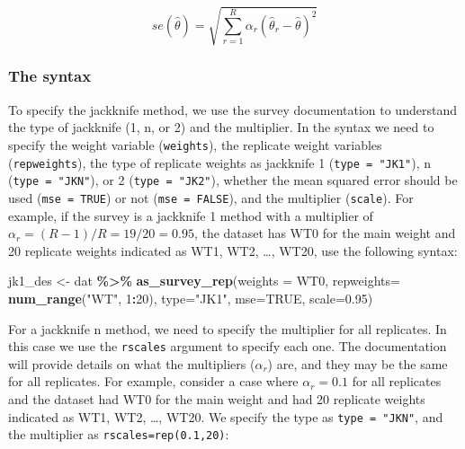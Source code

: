 \documentclass[
]{krantz}
\makeatletter
\newenvironment{Shaded}{\begin{snugshade}}{\end{snugshade}}
\newcommand{\AttributeTok}[1]{\textcolor[rgb]{0.27,0.27,0.27}{#1}}
\newcommand{\ConstantTok}[1]{\textcolor[rgb]{0.37,0.37,0.37}{#1}}
\newcommand{\DecValTok}[1]{\textcolor[rgb]{0.06,0.06,0.06}{#1}}
\newcommand{\FloatTok}[1]{\textcolor[rgb]{0.06,0.06,0.06}{#1}}
\newcommand{\FunctionTok}[1]{\textcolor[rgb]{0.27,0.27,0.27}{\textbf{#1}}}
\newcommand{\NormalTok}[1]{#1}
\newcommand{\OtherTok}[1]{\textcolor[rgb]{0.37,0.37,0.37}{#1}}
\newcommand{\SpecialCharTok}[1]{\textcolor[rgb]{0.43,0.43,0.43}{\textbf{#1}}}
\newcommand{\StringTok}[1]{\textcolor[rgb]{0.5,0.5,0.5}{#1}}
\newenvironment{kframe}{%
\medskip{}
\setlength{\fboxsep}{.8em}
 \def\at@end@of@kframe{}%
 \ifinner\ifhmode%
  \def\at@end@of@kframe{\end{minipage}}%
  \begin{minipage}{\columnwidth}%
 \fi\fi%
 \def\FrameCommand##1{\hskip\@totalleftmargin \hskip-\fboxsep
 \colorbox{shadecolor}{##1}\hskip-\fboxsep
     \hskip-\linewidth \hskip-\@totalleftmargin \hskip\columnwidth}%
 \MakeFramed {\advance\hsize-\width
   \@totalleftmargin\z@ \linewidth\hsize
   \@setminipage}}%
 {\par\unskip\endMakeFramed%
 \at@end@of@kframe}
\renewenvironment{Shaded}{\begin{kframe}}{\end{kframe}}
\makeatother
\begin{document}
\[se(\hat{\theta})=\sqrt{\sum_{r=1}^R \alpha_r \left( \hat{\theta}_r-\hat{\theta}\right)^2}\]

\hypertarget{the-syntax-6}{%
\subsubsection*{The syntax}\label{the-syntax-6}}


To specify the jackknife method, we use the survey documentation to understand the type of jackknife (1, n, or 2) and the multiplier. In the syntax we need to specify the weight variable (\texttt{weights}), the replicate weight variables (\texttt{repweights}), the type of replicate weights as jackknife 1 (\texttt{type\ =\ "JK1"}), n (\texttt{type\ =\ "JKN"}), or 2 (\texttt{type\ =\ "JK2"}), whether the mean squared error should be used (\texttt{mse\ =\ TRUE}) or not (\texttt{mse\ =\ FALSE}), and the multiplier (\texttt{scale}). For example, if the survey is a jackknife 1 method with a multiplier of \(\alpha_r=(R-1)/R=19/20=0.95\), the dataset has WT0 for the main weight and 20 replicate weights indicated as WT1, WT2, \ldots, WT20, use the following syntax:

\begin{Shaded}
\begin{Highlighting}[]
\NormalTok{jk1\_des }\OtherTok{\textless{}{-}}\NormalTok{ dat }\SpecialCharTok{\%\textgreater{}\%}
 \FunctionTok{as\_survey\_rep}\NormalTok{(}\AttributeTok{weights =}\NormalTok{ WT0, }
               \AttributeTok{repweights=} \FunctionTok{num\_range}\NormalTok{(}\StringTok{"WT"}\NormalTok{, }\DecValTok{1}\SpecialCharTok{:}\DecValTok{20}\NormalTok{),}
               \AttributeTok{type=}\StringTok{"JK1"}\NormalTok{, }
               \AttributeTok{mse=}\ConstantTok{TRUE}\NormalTok{, }
               \AttributeTok{scale=}\FloatTok{0.95}\NormalTok{)}
\end{Highlighting}
\end{Shaded}

For a jackknife n method, we need to specify the multiplier for all replicates. In this case we use the \texttt{rscales} argument to specify each one. The documentation will provide details on what the multipliers (\(\alpha_r\)) are, and they may be the same for all replicates. For example, consider a case where \(\alpha_r=0.1\) for all replicates and the dataset had WT0 for the main weight and had 20 replicate weights indicated as WT1, WT2, \ldots, WT20. We specify the type as \texttt{type\ =\ "JKN"}, and the multiplier as \texttt{rscales=rep(0.1,20)}:
\end{document}
